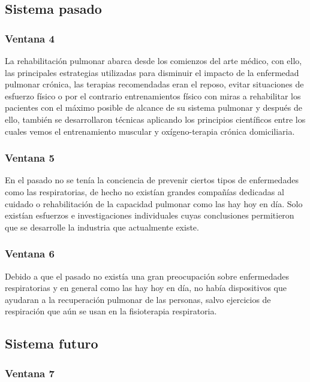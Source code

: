 \documentclass[12pt]{article}
\begin{document}
\subsection{Sistema pasado}

\subsubsection{Ventana 4}

La rehabilitación pulmonar abarca desde los comienzos del arte médico, con ello, las principales estrategias utilizadas para disminuir el impacto de la enfermedad pulmonar crónica, las terapias recomendadas eran el reposo, evitar situaciones de esfuerzo físico o por el contrario entrenamientos físico con miras a rehabilitar los pacientes con el máximo posible de alcance de su sistema pulmonar y después de ello, también se desarrollaron técnicas aplicando los principios científicos entre los cuales vemos el entrenamiento muscular y oxígeno-terapia crónica domiciliaria.

\subsubsection{Ventana 5}

En el pasado no se tenía la conciencia de prevenir ciertos tipos de enfermedades como las respiratorias, de hecho no existían grandes compañías dedicadas al cuidado o rehabilitación de la capacidad pulmonar como las hay hoy en día. Solo existían esfuerzos e investigaciones individuales cuyas conclusiones permitieron que se desarrolle la industria que actualmente existe.

\subsubsection{Ventana 6}

Debido a que el pasado no existía una gran preocupación sobre enfermedades respiratorias y en general como las hay hoy en día, no había dispositivos que ayudaran a la recuperación pulmonar de las personas, salvo ejercicios de respiración que aún se usan en la fisioterapia respiratoria. 




\subsection{Sistema futuro} 

\subsubsection{Ventana 7}
\end{document}
